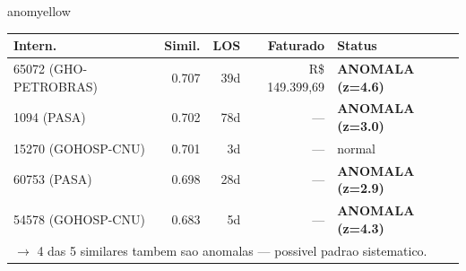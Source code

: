\documentclass[a4paper,10pt]{article}
\begin{document}
\begin{anomalycard}[Internacao 7737 | GHO-PETROBRAS | MODERADO (z=2.06)]{anomyellow}
\begin{tabular}{l r r r l}\toprule\textbf{Intern.} & \textbf{Simil.} & \textbf{LOS} & \textbf{Faturado} & \textbf{Status} \\\midrule
65072 (GHO-PETROBRAS) & 0.707 & 39d & R\$ 149.399,69 & \textcolor{anomred}{\textbf{ANOMALA (z=4.6)}} \\
1094 (PASA) & 0.702 & 78d & --- & \textcolor{anomred}{\textbf{ANOMALA (z=3.0)}} \\
15270 (GOHOSP-CNU) & 0.701 & 3d & --- & \textcolor{jcubeblue}{normal} \\
60753 (PASA) & 0.698 & 28d & --- & \textcolor{anomred}{\textbf{ANOMALA (z=2.9)}} \\
54578 (GOHOSP-CNU) & 0.683 & 5d & --- & \textcolor{anomred}{\textbf{ANOMALA (z=4.3)}} \\
\multicolumn{5}{l}{\textcolor{anomred}{\small $\rightarrow$ 4 das 5 similares tambem sao anomalas --- possivel padrao sistematico.}} \\
\bottomrule\end{tabular}


\end{anomalycard}

\newpage
\end{document}

